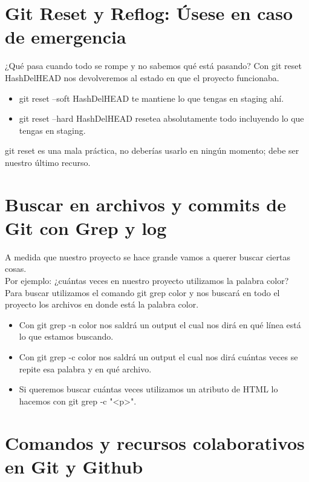 \documentclass{article}
\begin{document}
\section{Git Reset y Reflog: Úsese en caso de emergencia}%
¿Qué pasa cuando todo se rompe y no sabemos qué está pasando? Con git reset
HashDelHEAD nos devolveremos al estado en que el proyecto funcionaba.\\

\begin{itemize}
  \item git reset --soft HashDelHEAD te mantiene lo que tengas en staging ahí.
  \item git reset --hard HashDelHEAD resetea absolutamente todo incluyendo lo
    que tengas en staging.
\end{itemize}

git reset es una mala práctica, no deberías usarlo en ningún momento; debe ser
nuestro último recurso.


\section{Buscar en archivos y commits de Git con Grep y log}%
A medida que nuestro proyecto se hace grande vamos a querer buscar ciertas
cosas.\\

Por ejemplo: ¿cuántas veces en nuestro proyecto utilizamos la palabra color?\\

Para buscar utilizamos el comando git grep color y nos buscará en todo el
proyecto los archivos en donde está la palabra color.

\begin{itemize}
  \item Con git grep -n color nos saldrá un output el cual nos dirá en qué
    línea está lo que estamos buscando.
  \item Con git grep -c color nos saldrá un output el cual nos dirá cuántas
    veces se repite esa palabra y en qué archivo.
  \item Si queremos buscar cuántas veces utilizamos un atributo de HTML lo
    hacemos con git grep -c "<p>".
\end{itemize}


\section{Comandos y recursos colaborativos en Git y Github}%
\end{document}
